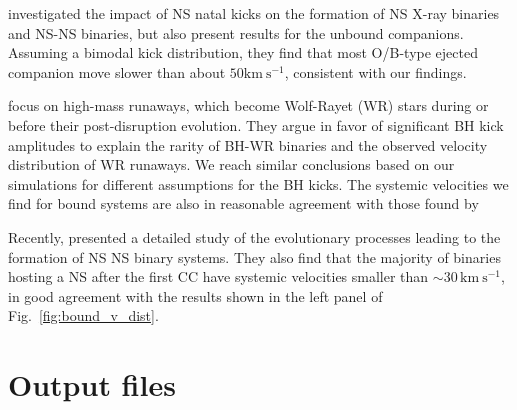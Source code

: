 \documentclass{aa}
\newcommand{\kms}{{\mathrm{km\ s^{-1}}}}
\DeclareRobustCommand{\Figref}[1]{Fig.~\ref{#1}}
\begin{document}
 \cite{fryer:98} investigated the impact of NS natal kicks on the
 formation of NS X-ray binaries and NS-NS binaries, but also present
 results for the unbound companions. Assuming a bimodal kick
 distribution, they find that most O/B-type ejected companion move
 slower than about $50\kms$, consistent with our findings.

 \cite{dray:05} focus on high-mass runaways, which become Wolf-Rayet (WR) stars during or before their post-disruption evolution. They argue in favor of significant BH kick amplitudes to explain the rarity of BH-WR binaries and the observed velocity distribution of WR runaways. We reach similar conclusions based on our simulations for different assumptions for the BH kicks. The systemic velocities we find for bound systems are also in reasonable agreement with those found by \cite{dray:05}

Recently, \cite{tauris:17} presented a detailed study of the evolutionary processes leading to the formation of NS NS binary systems. They also find that the majority of binaries hosting a NS after the first CC have systemic velocities smaller than $\sim 30\,\mathrm{km\ s^{-1}}$, in good agreement with the results shown in the left panel of \Figref{fig:bound_v_dist}.


\section{Output files}
\label{app:data}
\end{document}
